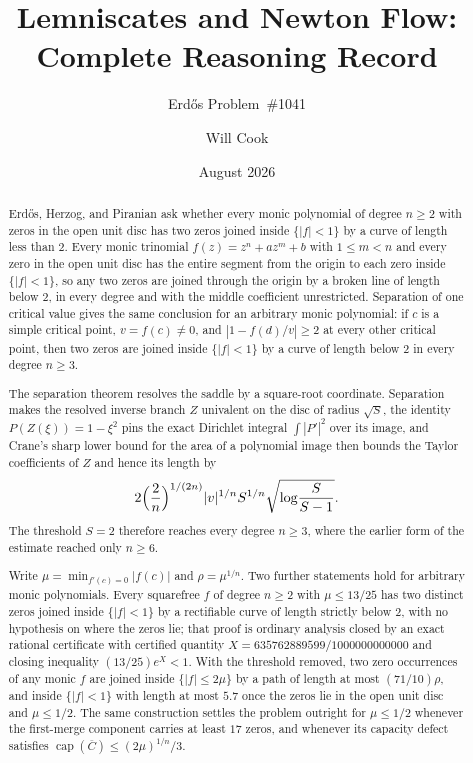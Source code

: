 \documentclass[11pt]{article}
\title{Lemniscates and Newton Flow: Complete Reasoning Record}
\subtitle{Erd\H{o}s Problem~\#1041}
\author{Will Cook}
\date{August 2026}
\begin{document}
\maketitle
\noteprovenance

\begin{abstract}
\noindent
Erd\H{o}s, Herzog, and Piranian ask whether every monic polynomial of degree
$n\ge2$ with zeros in the open unit disc has two zeros joined inside
$\{|f|<1\}$ by a curve of length less than $2$.  Every monic trinomial
$f(z)=z^n+az^m+b$ with $1\le m<n$ and every zero in the open unit disc has the
entire segment from the origin to each zero inside $\{|f|<1\}$, so any two
zeros are joined through the origin by a broken line of length below $2$, in
every degree and with the middle coefficient unrestricted.  Separation of one
critical value gives the same conclusion for an arbitrary monic polynomial: if
$c$ is a simple critical point, $v=f(c)\ne0$, and $|1-f(d)/v|\ge2$ at every
other critical point, then two zeros are joined inside $\{|f|<1\}$ by a curve
of length below $2$ in every degree $n\ge3$.

The separation theorem resolves the saddle by a square-root coordinate.
Separation makes the resolved inverse branch $Z$ univalent on the disc of
radius $\sqrt S$, the identity $P(Z(\xi))=1-\xi^2$ pins the exact Dirichlet
integral $\int|P'|^2$ over its image, and Crane's sharp lower bound for the
area of a polynomial image then bounds the Taylor coefficients of $Z$ and
hence its length by
\[
 2\Bigl(\frac2n\Bigr)^{1/(2n)}|v|^{1/n}S^{1/n}
   \sqrt{\log\!\frac{S}{S-1}}.
\]
The threshold $S=2$ therefore reaches every degree $n\ge3$, where the earlier
form of the estimate reached only $n\ge6$.

Write $\mu=\min_{f'(c)=0}|f(c)|$ and $\rho=\mu^{1/n}$.  Two further statements
hold for arbitrary monic polynomials.  Every squarefree $f$ of degree $n\ge2$
with $\mu\le13/25$ has two distinct zeros joined inside $\{|f|<1\}$ by a
rectifiable curve of length strictly below $2$, with no hypothesis on where the
zeros lie; that proof is ordinary analysis closed by an exact rational
certificate with certified quantity $X=635762889599/1000000000000$ and closing
inequality $(13/25)e^{X}<1$.  With the threshold removed, two zero occurrences
of any monic $f$ are joined inside $\{|f|\le2\mu\}$ by a path of length at most
$(71/10)\rho$, and inside $\{|f|<1\}$ with length at most $5.7$ once the zeros
lie in the open unit disc and $\mu\le1/2$.  The same construction settles the
problem outright for $\mu\le1/2$ whenever the first-merge component carries at
least $17$ zeros, and whenever its capacity defect satisfies
$\operatorname{cap}(\overline C)\le(2\mu)^{1/n}/3$.


\end{abstract}
\end{document}

